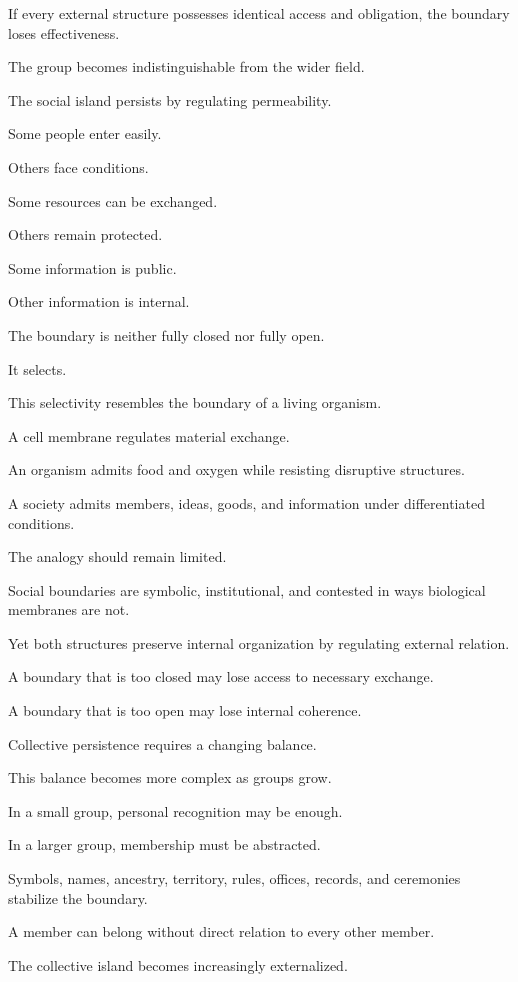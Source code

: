 If every external structure possesses identical access and obligation, the boundary loses effectiveness.

The group becomes indistinguishable from the wider field.

The social island persists by regulating permeability.

Some people enter easily.

Others face conditions.

Some resources can be exchanged.

Others remain protected.

Some information is public.

Other information is internal.

The boundary is neither fully closed nor fully open.

It selects.

This selectivity resembles the boundary of a living organism.

A cell membrane regulates material exchange.

An organism admits food and oxygen while resisting disruptive structures.

A society admits members, ideas, goods, and information under differentiated conditions.

The analogy should remain limited.

Social boundaries are symbolic, institutional, and contested in ways biological membranes are not.

Yet both structures preserve internal organization by regulating external relation.

A boundary that is too closed may lose access to necessary exchange.

A boundary that is too open may lose internal coherence.

Collective persistence requires a changing balance.

This balance becomes more complex as groups grow.

In a small group, personal recognition may be enough.

In a larger group, membership must be abstracted.

Symbols, names, ancestry, territory, rules, offices, records, and ceremonies stabilize the boundary.

A member can belong without direct relation to every other member.

The collective island becomes increasingly externalized.

